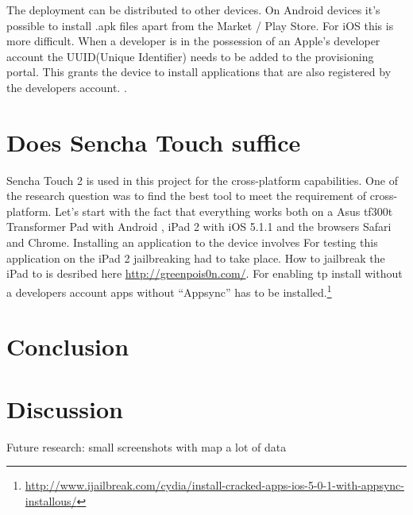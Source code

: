 The deployment can be distributed to other devices. On Android devices it's possible to install .apk files apart from the Market / Play Store. For iOS this is more difficult. When a developer is in the possession of an Apple's developer account the UUID(Unique Identifier) needs to be added to the provisioning portal. This grants the device to install applications that are also registered by the developers account. .

\section{Does Sencha Touch suffice}
Sencha Touch 2 is used in this project for the cross-platform capabilities. One of the research question was to find the best tool to meet the requirement of cross-platform. Let's start with the fact that everything works both on a Asus tf300t Transformer Pad with Android , iPad 2 with iOS 5.1.1 and the browsers Safari and Chrome. Installing an application to the device involves For testing this application on the iPad 2 jailbreaking had to take place. How to jailbreak the iPad to is desribed here \url{http://greenpois0n.com/}. For enabling tp install without a developers account apps without ``Appsync'' has to be installed.\footnote{\url{http://www.ijailbreak.com/cydia/install-cracked-apps-ios-5-0-1-with-appsync-installous/}}



\section{Conclusion}

\section{Discussion}
Future research:
small screenshots with map
a lot of data

